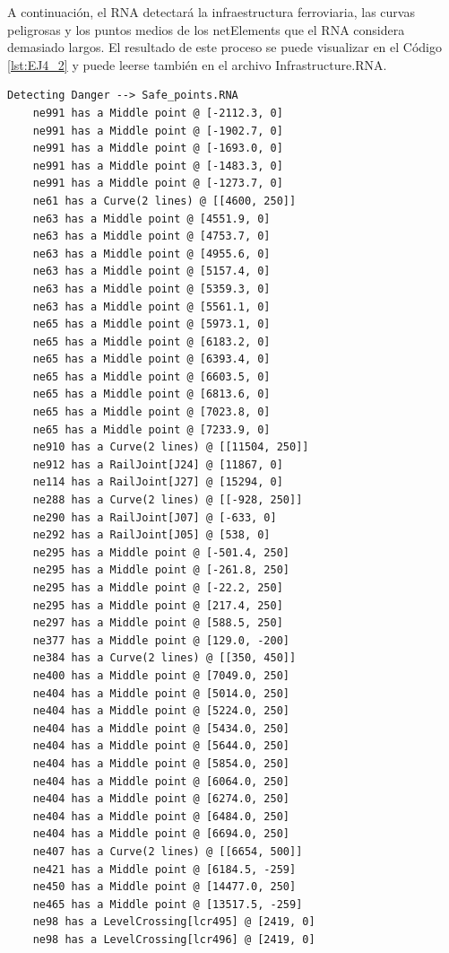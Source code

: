 A continuación, el RNA detectará la infraestructura ferroviaria, las curvas peligrosas y los puntos medios de los netElements que el RNA considera demasiado largos. El resultado de este proceso se puede visualizar en el Código \ref{lst:EJ4_2} y puede leerse también en el archivo Infrastructure.RNA.

\begin{lstlisting}[language = {}, tabsize=4, basicstyle=\footnotesize\ttfamily, showspaces=false, showstringspaces=false, caption = Detección de puntos críticos por parte del RNA , label = {lst:EJ4_2}]
	Detecting Danger --> Safe_points.RNA
	ne991 has a Middle point @ [-2112.3, 0]
	ne991 has a Middle point @ [-1902.7, 0]
	ne991 has a Middle point @ [-1693.0, 0]
	ne991 has a Middle point @ [-1483.3, 0]
	ne991 has a Middle point @ [-1273.7, 0]
	ne61 has a Curve(2 lines) @ [[4600, 250]]
	ne63 has a Middle point @ [4551.9, 0]
	ne63 has a Middle point @ [4753.7, 0]
	ne63 has a Middle point @ [4955.6, 0]
	ne63 has a Middle point @ [5157.4, 0]
	ne63 has a Middle point @ [5359.3, 0]
	ne63 has a Middle point @ [5561.1, 0]
	ne65 has a Middle point @ [5973.1, 0]
	ne65 has a Middle point @ [6183.2, 0]
	ne65 has a Middle point @ [6393.4, 0]
	ne65 has a Middle point @ [6603.5, 0]
	ne65 has a Middle point @ [6813.6, 0]
	ne65 has a Middle point @ [7023.8, 0]
	ne65 has a Middle point @ [7233.9, 0]
	ne910 has a Curve(2 lines) @ [[11504, 250]]
	ne912 has a RailJoint[J24] @ [11867, 0]
	ne114 has a RailJoint[J27] @ [15294, 0]
	ne288 has a Curve(2 lines) @ [[-928, 250]]
	ne290 has a RailJoint[J07] @ [-633, 0]
	ne292 has a RailJoint[J05] @ [538, 0]
	ne295 has a Middle point @ [-501.4, 250]
	ne295 has a Middle point @ [-261.8, 250]
	ne295 has a Middle point @ [-22.2, 250]
	ne295 has a Middle point @ [217.4, 250]
	ne297 has a Middle point @ [588.5, 250]
	ne377 has a Middle point @ [129.0, -200]
	ne384 has a Curve(2 lines) @ [[350, 450]]
	ne400 has a Middle point @ [7049.0, 250]
	ne404 has a Middle point @ [5014.0, 250]
	ne404 has a Middle point @ [5224.0, 250]
	ne404 has a Middle point @ [5434.0, 250]
	ne404 has a Middle point @ [5644.0, 250]
	ne404 has a Middle point @ [5854.0, 250]
	ne404 has a Middle point @ [6064.0, 250]
	ne404 has a Middle point @ [6274.0, 250]
	ne404 has a Middle point @ [6484.0, 250]
	ne404 has a Middle point @ [6694.0, 250]
	ne407 has a Curve(2 lines) @ [[6654, 500]]
	ne421 has a Middle point @ [6184.5, -259]
	ne450 has a Middle point @ [14477.0, 250]
	ne465 has a Middle point @ [13517.5, -259]
	ne98 has a LevelCrossing[lcr495] @ [2419, 0]
	ne98 has a LevelCrossing[lcr496] @ [2419, 0]

\end{lstlisting}
